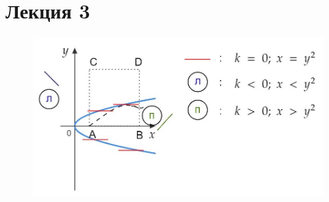 \section{\Large{Лекция 3}}

\begin{figure}
\includegraphics[width=\linewidth]{images/p4.jpg}
\caption[]{}
\label{ris2}
\end{figure}
